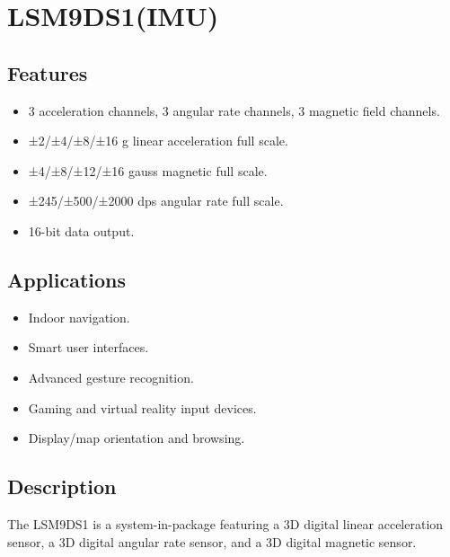 %
%



\chapter{LSM9DS1(IMU)}

\section{Features}

\begin{itemize}
	\item 3 acceleration channels, 3 angular rate channels, 3 magnetic field channels.
	\item ±2/±4/±8/±16 g linear acceleration full scale.
	\item ±4/±8/±12/±16 gauss magnetic full scale.
	\item ±245/±500/±2000 dps angular rate full scale.
	\item 16-bit data output.
\end{itemize}

\section{Applications}
\begin{itemize}
	\item Indoor navigation.
	\item Smart user interfaces.
	\item Advanced gesture recognition.
	\item Gaming and virtual reality input devices.
	\item Display/map orientation and browsing.
\end{itemize}

\section{Description}
The LSM9DS1 is a system-in-package featuring a 
3D digital linear acceleration sensor, a 3D digital angular rate sensor, and a 3D digital magnetic sensor.


